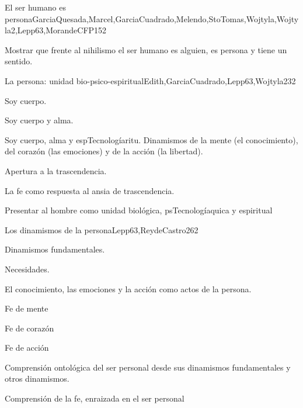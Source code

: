 \begin{syllabus}
\begin{unit}{El ser humano es persona}{GarciaQuesada,Marcel,GarciaCuadrado,Melendo,StoTomas,Wojtyla,Wojtyla2,Lepp63,MorandeCFP}{15}{2}
\begin{unitgoals}
	\item Mostrar que frente al nihilismo el ser humano es alguien, es persona y tiene un sentido.
\end{unitgoals}
\end{unit}

\begin{unit}{La persona: unidad bio-psico-espiritual}{Edith,GarciaCuadrado,Lepp63,Wojtyla2}{3}{2}
\begin{topics}
 		\item Soy cuerpo.
 		\item Soy cuerpo y alma.
 		\item Soy cuerpo, alma y espTecnologíaritu.  Dinamismos de la mente (el conocimiento), del corazón (las emociones) y de la acción (la libertad).
 		\item Apertura a la trascendencia.
 		\item La fe como respuesta al ansia de trascendencia.
\end{topics}

\begin{unitgoals}
	\item Presentar al hombre como unidad biológica, psTecnologíaquica y espiritual
\end{unitgoals}
\end{unit}

\begin{unit}{Los dinamismos de la persona}{Lepp63,ReydeCastro2}{6}{2}
\begin{topics}
 	 		\item Dinamismos fundamentales.
 	 		\item Necesidades.
 	 		\item El conocimiento, las emociones y la acción como actos de la persona.
 	 		\item Fe de mente
 	 		\item Fe de corazón
 	 		\item Fe de acción
\end{topics}

\begin{unitgoals}
	\item Comprensión ontológica del ser personal desde sus dinamismos fundamentales y otros dinamismos.
	\item Comprensión de la fe, enraizada en el ser personal

\end{unitgoals}
\end{unit}


\end{syllabus}
